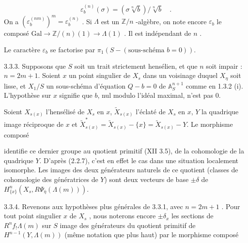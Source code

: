 \begin{equation*}
\varepsilon_b^{(n)}(\sigma) = (\sigma \sqrt[n]{b})/ \sqrt[n]{b} \quad .
\end{equation*}
On a $(\varepsilon_b^{(nm)})^m=\varepsilon_b^{(n)}$ . Si $\Lambda$ est un $\mathbb{Z}/n$ -algèbre, on note encore $\varepsilon_b$ le composé $\mathrm{Gal}\longrightarrow \mathbb{Z}/(n)(1)\longrightarrow \Lambda(1)$ . Il est indépendant de $n$ .

Le caractère $\varepsilon_b$ se factorise par $\pi_1(S-(\text{sous-schéma } b=0))$.

3.3.3. Supposons que $S$ soit un trait strictement hensélien, et que $n$ soit impair : $n=2m+1$. Soient $x$ un point singulier de $X_s$ dans un voisinage duquel $X_\eta$ soit lisse, et $X_1/S$ un sous-schéma d'équation $Q-b=0$ de $\mathbb{A}^{n+1}_S$ comme en 1.3.2 (i). L'hypothèse sur $x$ signifie que $b$, nul modulo l'idéal maximal, n'est pas 0.

Soient $X_{s(x)}$ l'hensélisé de $X_s$ en $x$, $\widetilde{X}_{s(x)}$ l'éclaté de $X_s$ en $x$, $Y$ la quadrique image réciproque de $x$ et $\widetilde{X}^{*}_{s(x)}=\widetilde{X}_{s(x)}-\{x\}=\widetilde{X}_{s(x)}-Y$. Le morphisme composé

\begin{center}
\end{center}
identifie ce dernier groupe au quotient primitif (XII 3.5), de la cohomologie de la quadrique $Y$. D'après (2.2.7), c'est en effet le cas dans une situation localement isomorphe. Les images des deux générateurs naturels de ce quotient (classes de cohomologie des génératrices de $Y$) sont deux vecteurs de base $\pm\delta$ de $H^n_{\{x\}}(X_s,R\Psi_{\bar\eta}(\Lambda(m)))$.



3.3.4.  Revenons aux hypothèses plus générales de 3.3.1, avec $n = 2m + 1$ . Pour tout point singulier $x$ de $X_s$ , nous noterons encore $\pm \delta_x$ les sections de $R^n f_! \Lambda(m)$ sur $S$ image des générateurs du quotient primitif de $H^{n-1}(Y,\Lambda(m))$ (même notation que plus haut) par le morphisme composé

